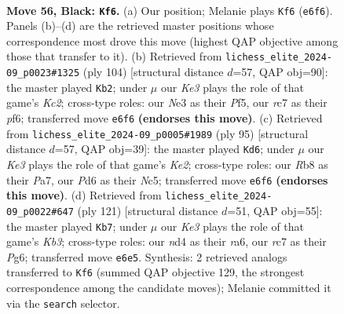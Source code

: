 \documentclass[11pt]{article}
\begin{document}
\clearpage

\begin{figure}[p]\centering
\begin{subfigure}{0.46\textwidth}\centering
\resizebox{\linewidth}{!}{%
\newchessgame
\chessboard[
  setfen={1r6/2R5/3pk3/8/3N2pp/1p2n3/3R2Pr/6K1 b - - 3 56},
  showmover=false,
  pgfstyle=straightmove, color=movearrow, markmove={e6-f6}
]}
\caption{}
\end{subfigure}\hfill
\begin{subfigure}{0.46\textwidth}\centering
\resizebox{\linewidth}{!}{%
\newchessgame
\chessboard[
  setfen={r7/3kp3/5p2/5P2/p2n2P1/R1P5/2K5/8 w - - 0 53},
  showmover=false,
  pgfstyle=straightmove, color=movearrow, markmove={c2-b2}
]}
\caption{}
\end{subfigure}
\\[4pt]
\begin{subfigure}{0.46\textwidth}\centering
\resizebox{\linewidth}{!}{%
\newchessgame
\chessboard[
  setfen={8/p3k3/6p1/2n4p/3KPP2/r1p3P1/P1R5/3N4 b - - 9 48},
  showmover=false,
  pgfstyle=straightmove, color=movearrow, markmove={e7-d6}
]}
\caption{}
\end{subfigure}\hfill
\begin{subfigure}{0.46\textwidth}\centering
\resizebox{\linewidth}{!}{%
\newchessgame
\chessboard[
  setfen={r7/P7/Rkp3p1/5bP1/1r5p/8/5PNK/R7 b - - 1 61},
  showmover=false,
  pgfstyle=straightmove, color=movearrow, markmove={b6-b7}
]}
\caption{}
\end{subfigure}
\caption{\textbf{Move 56, Black: \texttt{Kf6}.} (a) Our position; Melanie plays \texttt{Kf6} (\texttt{e6f6}). Panels (b)--(d) are the retrieved master positions whose correspondence most drove this move (highest QAP objective among those that transfer to it). (b) Retrieved from \texttt{lichess\_elite\_2024-09\_p0023\#1325} (ply 104) [structural distance $d$=57, QAP obj=90]: the master played \texttt{Kb2}; under $\mu$ our \emph{Ke3} plays the role of that game's \emph{Kc2}; cross-type roles: our \emph{N}e3 as their \emph{P}f5, our \emph{r}c7 as their \emph{p}f6; transferred move \texttt{e6f6} \textbf{(endorses this move)}. (c) Retrieved from \texttt{lichess\_elite\_2024-09\_p0005\#1989} (ply 95) [structural distance $d$=57, QAP obj=39]: the master played \texttt{Kd6}; under $\mu$ our \emph{Ke3} plays the role of that game's \emph{Ke2}; cross-type roles: our \emph{R}b8 as their \emph{P}a7, our \emph{P}d6 as their \emph{N}c5; transferred move \texttt{e6f6} \textbf{(endorses this move)}. (d) Retrieved from \texttt{lichess\_elite\_2024-09\_p0022\#647} (ply 121) [structural distance $d$=51, QAP obj=55]: the master played \texttt{Kb7}; under $\mu$ our \emph{Ke3} plays the role of that game's \emph{Kb3}; cross-type roles: our \emph{n}d4 as their \emph{r}a6, our \emph{r}c7 as their \emph{P}g6; transferred move \texttt{e6e5}. Synthesis: 2 retrieved analogs transferred to \texttt{Kf6} (summed QAP objective 129, the strongest correspondence among the candidate moves); Melanie committed it via the \texttt{search} selector.}
\label{fig:thought-m111}
\end{figure}
\end{document}
